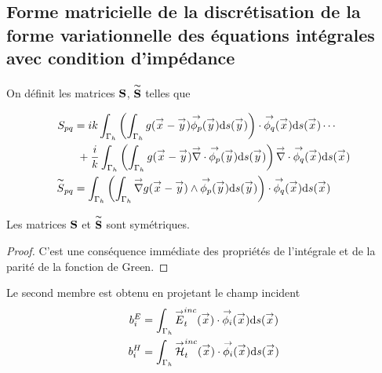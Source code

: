 
  \subsection{Forme matricielle de la discrétisation de la forme variationnelle des équations intégrales avec condition d'impédance}

    \begin{defn}
      On définit les matrices \(\mS\), \(\mSt\) telles que

      \begin{align}
        S_{pq}
          &= ik \int_{\Gamma_h} \left( \int_{\Gamma_h} g(\vx - \vy) \phip(\vy) \dd{s}(\vy) \right) \cdot \phiq (\vx)\dd{s}(\vx) \cdots\\
          \notag&~+ \frac{i}{k}\int_{\Gamma_h} \left( \int_{\Gamma_h} g(\vx - \vy) \vdiv \phip (\vy) \dd{s}(\vy) \right) \vdiv \phiq(\vx)\dd{s}(\vx)\\
        \tilde{S}_{pq}
          &= \int_{\Gamma_h} \left( \int_{\Gamma_h} \vgrad g(\vx - \vy) \pvect \phip(\vy) \dd{s}(\vy) \right) \cdot \phiq(\vx)\dd{s}(\vx)
      \end{align}
    \end{defn}

    \begin{prop}
      Les matrices \(\mS\) et \(\mSt\) sont symétriques.
    \end{prop}
    \begin{proof}
      C'est une conséquence immédiate des propriétés de l'intégrale et de la parité de la fonction de Green.
    \end{proof}

    Le second membre est obtenu en projetant le champ incident
    \begin{subequations}
      \begin{align}
        b_i^E &= \int_{\Gamma_h} \vE_t^{inc}(\vx) \cdot \phii(\vx)\dd{s}(\vx) \\
        b_i^H &= \int_{\Gamma_h} \vH_t^{inc}(\vx) \cdot \phii(\vx)\dd{s}(\vx)
      \end{align}
    \end{subequations}

